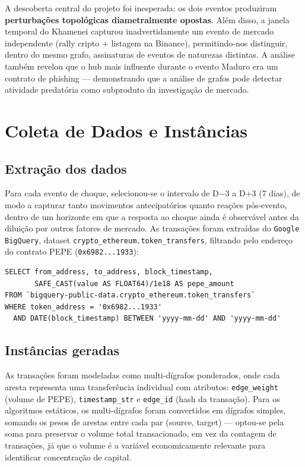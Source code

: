 \documentclass[12pt,a4paper]{article}
\begin{document}
A descoberta central do projeto foi inesperada: os dois eventos produziram \textbf{perturbações topológicas diametralmente opostas}. Além disso, a janela temporal do Khamenei capturou inadvertidamente um evento de mercado independente (rally cripto + listagem na Binance), permitindo-nos distinguir, dentro do mesmo grafo, assinaturas de eventos de naturezas distintas. A análise também revelou que o hub mais influente durante o evento Maduro era um contrato de phishing --- demonstrando que a análise de grafos pode detectar atividade predatória como subproduto da investigação de mercado.

\section{Coleta de Dados e Instâncias}

\subsection{Extração dos dados}

Para cada evento de choque, selecionou-se o intervalo de D$-$3 a D$+$3 (7 dias), de modo a capturar tanto movimentos antecipatórios quanto reações pós-evento, dentro de um horizonte em que a resposta ao choque ainda é observável antes da diluição por outros fatores de mercado. As transações foram extraídas do \texttt{Google BigQuery}, dataset \texttt{crypto\_ethereum.token\_transfers}, filtrando pelo endereço do contrato PEPE (\texttt{0x6982...1933}):

\begin{verbatim}
SELECT from_address, to_address, block_timestamp,
       SAFE_CAST(value AS FLOAT64)/1e18 AS pepe_amount
FROM `bigquery-public-data.crypto_ethereum.token_transfers`
WHERE token_address = '0x6982...1933'
  AND DATE(block_timestamp) BETWEEN 'yyyy-mm-dd' AND 'yyyy-mm-dd'
\end{verbatim}

\subsection{Instâncias geradas}

As transações foram modeladas como multi-dígrafos ponderados, onde cada aresta representa uma transferência individual com atributos: \texttt{edge\_weight} (volume de PEPE), \texttt{timestamp\_str} e \texttt{edge\_id} (hash da transação). Para os algoritmos estáticos, os multi-dígrafos foram convertidos em dígrafos simples, somando os pesos de arestas entre cada par (source, target) --- optou-se pela soma para preservar o volume total transacionado, em vez da contagem de transações, já que o volume é a variável economicamente relevante para identificar concentração de capital.
\end{document}
